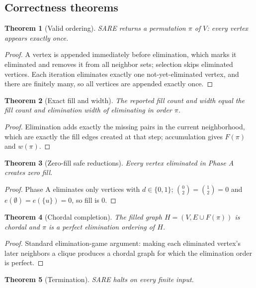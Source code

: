 \documentclass[11pt]{article}
\theoremstyle{plain}
\newtheorem{theorem}{Theorem}
\theoremstyle{definition}
\begin{document}
\subsection{Correctness theorems}
\begin{theorem}[Valid ordering]\label{t:valid}
SARE returns a permutation $\pi$ of $V$: every vertex appears exactly once.
\end{theorem}
\begin{proof}
A vertex is appended immediately before elimination, which marks it eliminated and removes
it from all neighbor sets; selection skips eliminated vertices. Each iteration eliminates
exactly one not-yet-eliminated vertex, and there are finitely many, so all vertices are
appended exactly once.
\end{proof}

\begin{theorem}[Exact fill and width]\label{t:exact}
The reported fill count and width equal the fill count and elimination width of eliminating
in order $\pi$.
\end{theorem}
\begin{proof}
Elimination adds exactly the missing pairs in the current neighborhood, which are exactly
the fill edges created at that step; accumulation gives $F(\pi)$ and $w(\pi)$.
\end{proof}

\begin{theorem}[Zero-fill safe reductions]\label{t:zerofill}
Every vertex eliminated in Phase A creates zero fill.
\end{theorem}
\begin{proof}
Phase A eliminates only vertices with $d\in\{0,1\}$; $\binom{0}{2}=\binom{1}{2}=0$ and
$e(\emptyset)=e(\{u\})=0$, so fill is 0.
\end{proof}

\begin{theorem}[Chordal completion]\label{t:chordal}
The filled graph $H=(V,E\cup F(\pi))$ is chordal and $\pi$ is a perfect elimination
ordering of $H$.
\end{theorem}
\begin{proof}
Standard elimination-game argument: making each eliminated vertex's later neighbors a clique
produces a chordal graph for which the elimination order is perfect.
\end{proof}

\begin{theorem}[Termination]\label{t:term}
SARE halts on every finite input.
\end{theorem}
\end{document}
